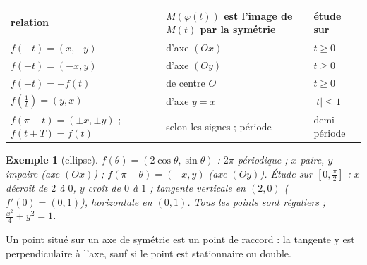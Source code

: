 \documentclass[a4paper,11pt]{article}
\numberwithin{equation}{section}
\numberwithin{figure}{section}
\numberwithin{table}{section}
\theoremstyle{enonce}
\theoremstyle{exemple}
\newtheorem{exemple}[definition]{Exemple}
\theoremstyle{remarque}
\begin{document}
\begin{center}
\renewcommand{\arraystretch}{1.2}\footnotesize
\begin{tabular}{lll}
\toprule
relation & $M(\varphi(t))$ est l'image de $M(t)$ par la symétrie & étude sur\\\midrule
$f(-t)=(x,-y)$ & d'axe $(Ox)$ & $t\geq0$\\
$f(-t)=(-x,y)$ & d'axe $(Oy)$ & $t\geq0$\\
$f(-t)=-f(t)$ & de centre $O$ & $t\geq0$\\
$f\left(\frac1t\right)=(y,x)$ & d'axe $y=x$ & $|t|\leq1$\\
$f(\pi-t)=(\pm x,\pm y)$ ; $f(t+T)=f(t)$ & selon les signes ; période & demi-période\\\bottomrule
\end{tabular}
\end{center}

\begin{exemple}[ellipse]
$f(\theta)=(2\cos\theta,\sin\theta)$ : $2\pi$-périodique ; $x$ paire, $y$ impaire (axe $(Ox)$) ; $f(\pi-\theta)=(-x,y)$ (axe
$(Oy)$). Étude sur $\left[0,\frac\pi2\right]$ : $x$ décroît de $2$ à $0$, $y$ croît de $0$ à $1$ ; tangente verticale en
$(2,0)$ ($f'(0)=(0,1)$), horizontale en $(0,1)$. Tous les points sont réguliers ; $\frac{x^2}4+y^2=1$.
\end{exemple}

\begin{reflexe}
Un point situé sur un axe de symétrie est un point de raccord : la tangente y est perpendiculaire à l'axe, sauf si le point
est stationnaire ou double.
\end{reflexe}
\end{document}
